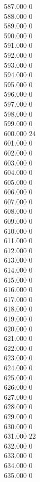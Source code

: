 { 587.000	0 \\
 588.000	0 \\
 589.000	0 \\
 590.000	0 \\
 591.000	0 \\
 592.000	0 \\
 593.000	0 \\
 594.000	0 \\
 595.000	0 \\
 596.000	0 \\
 597.000	0 \\
 598.000	0 \\
 599.000	0 \\
 600.000	24 \\
 601.000	0 \\
 602.000	0 \\
 603.000	0 \\
 604.000	0 \\
 605.000	0 \\
 606.000	0 \\
 607.000	0 \\
 608.000	0 \\
 609.000	0 \\
 610.000	0 \\
 611.000	0 \\
 612.000	0 \\
 613.000	0 \\
 614.000	0 \\
 615.000	0 \\
 616.000	0 \\
 617.000	0 \\
 618.000	0 \\
 619.000	0 \\
 620.000	0 \\
 621.000	0 \\
 622.000	0 \\
 623.000	0 \\
 624.000	0 \\
 625.000	0 \\
 626.000	0 \\
 627.000	0 \\
 628.000	0 \\
 629.000	0 \\
 630.000	0 \\
 631.000	22 \\
 632.000	0 \\
 633.000	0 \\
 634.000	0 \\
 635.000	0 \\
}

